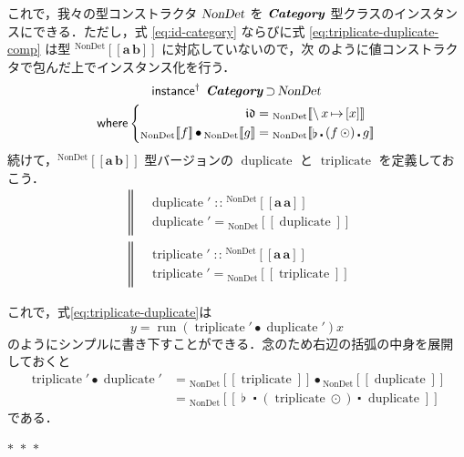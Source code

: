 \documentclass[a5paper,twoside,fleqn,draft]{jsbook}
\def\[{[\![}
\def\]{]\!]}
\newcommand{\separator}{\begin{center}$*$~$*$~$*$\end{center}}
\newcommand{\mBrace}{\Vert}
\newcommand{\mKeyword}[1]{\mathsf{#1}}
\newcommand{\mInstanceDeclKeyword}{\mKeyword{instance}}
\newcommand{\mWhereKeyword}{\mKeyword{where}}
\newcommand{\mPolymorphic}[1]{{#1}^\dagger}
\DeclareMathOperator{\mInstanceDeclPolymorphic}{\mPolymorphic{\mInstanceDeclKeyword}}
\DeclareMathOperator{\mSuperSet}{\supset}
\DeclareMathOperator{\mWhere}{\mWhereKeyword}
\newcommand{\mSpecialFunc}[1]{\mathrm{#1}}
\newcommand{\mVarSpecialFunc}[1]{\mathfrak{#1}}
\DeclareMathOperator{\mDuplicate}{\mSpecialFunc{duplicate}}
\DeclareMathOperator{\mIdCat}{\mVarSpecialFunc{id}}
\DeclareMathOperator{\mRun}{\mSpecialFunc{run}}
\DeclareMathOperator{\mTriplicate}{\mSpecialFunc{triplicate}}
\DeclareMathOperator{\mCompFunc}{\centerdot}
\DeclareMathOperator{\mCompCat}{\bullet}
\DeclareMathOperator{\mIn}{{:\!:}}
\DeclareMathOperator{\mJoinList}{\flat} %
\DeclareMathOperator{\mLambda}{\backslash}
\DeclareMathOperator{\mLambdaArrow}{\mapsto}
\DeclareMathOperator{\mMapList}{\odot}
\newcommand{\mType}[1]{\mathbf{#1}} %
\newcommand{\mA}{\mType{a}}
\newcommand{\mB}{\mType{b}}
\newcommand{\mTypeAssemble}[2]{{}^\mathrm{#1}\[\mType{#2}\]}
\newcommand{\mTypeConstructor}[1]{\textsl{#1}}
\newcommand{\mValueConstructor}[1]{\mathrm{#1}}
\newcommand{\mValueWith}[2]{{}_\mValueConstructor{#1}\[#2\]}
\newcommand{\mTypeClass}[1]{\textbf{\textit{#1}}}
\newcommand{\mCatTypeClass}{\mTypeClass{Category}}
\newcommand{\mLambdaEXP}[2]{\mLambda{#1}\mLambdaArrow{#2}} %
\begin{document}
これで，我々の型コンストラクタ $\mTypeConstructor{NonDet}$ を
$\mCatTypeClass$ 型クラスのインスタンスにできる．ただし，式
\eqref{eq:id-category} ならびに式 \eqref{eq:triplicate-duplicate-comp}
は型 $\mTypeAssemble{NonDet}{\mA\,\mB}$ に対応していないので，次
のように値コンストラクタで包んだ上でインスタンス化を行う．
\begin{multline}
  \label{eq:nondet-instance}
  \mInstanceDeclPolymorphic\;
  \mTypeClass{Category}\mSuperSet\mTypeConstructor{NonDet}\\
  \mWhere\left\{
  \begin{aligned}
    \mIdCat
    &=\mValueWith{NonDet}{\mLambdaEXP{x}{[x]}}\\
    \mValueWith{NonDet}{f}\mCompCat\mValueWith{NonDet}{g}
    &=\mValueWith{NonDet}{\mJoinList\mCompFunc{}(f\mMapList)\mCompFunc g}
  \end{aligned}
  \right.
\end{multline}
続けて，$\mTypeAssemble{NonDet}{\mA\,\mB}$ 型バージョンの
$\mDuplicate$ と $\mTriplicate$ を定義しておこう．
\begin{align}
  &\left\mBrace
  \begin{aligned}
    &\mDuplicate'
    \mIn\mTypeAssemble{NonDet}{\mA\,\mA}\\
    &\mDuplicate'
    =\mValueWith{NonDet}{\mDuplicate}
  \end{aligned}
  \right.\\
  &\left\mBrace
  \begin{aligned}
    &\mTriplicate'
    \mIn\mTypeAssemble{NonDet}{\mA\,\mA}\\
    &\mTriplicate'
    =\mValueWith{NonDet}{\mTriplicate}
  \end{aligned}
  \right.
\end{align}

これで，式\eqref{eq:triplicate-duplicate}は
\begin{equation}
  y=\mRun(\mTriplicate'\mCompCat\mDuplicate')x
\end{equation}
のようにシンプルに書き下すことができる．念のため右辺の括弧の中身を展開
しておくと
\begin{align}
  \mTriplicate'\mCompCat\mDuplicate'
  &=\mValueWith{NonDet}{\mTriplicate}\mCompCat\mValueWith{NonDet}{\mDuplicate}\\
  &=\mValueWith{NonDet}{\mJoinList\mCompFunc{}(\mTriplicate\mMapList)\mCompFunc\mDuplicate}
\end{align}
である．

\separator
\end{document}
